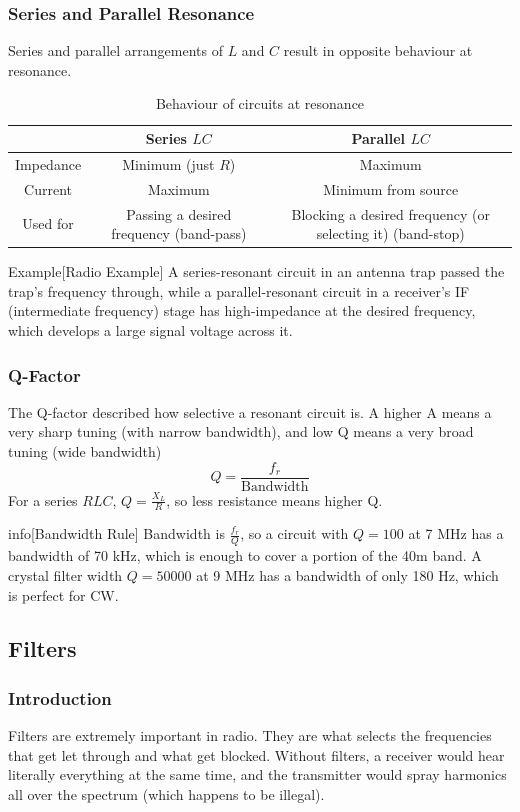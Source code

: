 \documentclass{article}
\begin{document}
\subsubsection{Series and Parallel Resonance}
Series and parallel arrangements of $L$ and $C$ result in opposite behaviour at resonance.
\begin{table}[h]
    \centering
    \caption{Behaviour of circuits at resonance}
    \label{tab:1}
    \begin{tabular}{c|c|c}
        & Series $LC$ & Parallel $LC$ \\
        \hline
        \hline
        Impedance & Minimum (just $R$) & Maximum \\
        Current & Maximum & Minimum from source \\
        Used for & Passing a desired frequency (band-pass) & Blocking a desired frequency (or selecting it) (band-stop)
    \end{tabular}
\end{table}

\begin{callout}{Example}[Radio Example]
    A series-resonant circuit in an antenna trap passed the trap's frequency through, while a parallel-resonant circuit in a receiver's IF (intermediate frequency) stage has high-impedance at the desired frequency, which develops a large signal voltage across it.
\end{callout}

\subsubsection{Q-Factor}
The Q-factor described how selective a resonant circuit is. A higher A means a very sharp tuning (with narrow bandwidth), and low Q means a very broad tuning (wide bandwidth)
\[
    Q=\frac{f_r}{\text{Bandwidth}}
\]
For a series $RLC$, $Q=\frac{X_L}{R}$, so less resistance means higher Q.
\begin{callout}{info}[Bandwidth Rule]
    Bandwidth is $\frac{f_r}{Q}$, so a circuit with $Q=100$ at 7 MHz has a bandwidth of 70 kHz, which is enough to cover a portion of the 40m band. A crystal filter width $Q=50 000$ at 9 MHz has a bandwidth of only 180 Hz, which is perfect for CW.
\end{callout}

\subsection{Filters}
\subsubsection{Introduction}
Filters are extremely important in radio. They are what selects the frequencies that get let through and what get blocked. Without filters, a receiver would hear literally everything at the same time, and the transmitter would spray harmonics all over the spectrum (which happens to be illegal).
\end{document}
